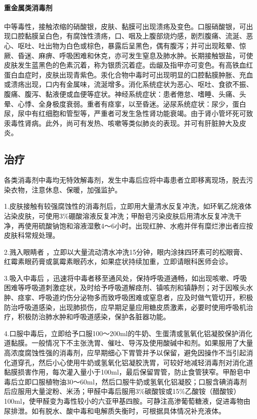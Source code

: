 \paragraph{重金属类消毒剂}

中等毒性，接触浓缩的硝酸银，皮肤、黏膜可出现溃疡及变色。口服硝酸银，可出现口腔黏膜呈白色，有腐蚀性溃疡，口、咽及上腹部烧灼感，剧烈腹痛、流涎、恶心、呕吐、吐出物为白色或棕色，暴露后呈黑色，偶有腹泻；并可出现眩晕、惊厥、昏迷、麻痹、呼吸困难和休克，亦可发生窒息及肺水肿。长期接触银盐，可使皮肤发生蓝黑色的色素沉着，称为银质沉着症。齿龈及指甲亦可变色。有高铁血红蛋白血症时，皮肤出现青紫色。汞化合物中毒时可出现明显的口腔黏膜肿胀、充血或溃疡出现，口内有金属味，流涎增多。消化系统症状为恶心、呕吐、食欲不振、腹痛、腹泻、黏液便或血便等症状。神经系统症状：患者倦怠、嗜睡、头痛、头晕、心悸、全身极度衰弱。重者有痉挛，以至昏迷。泌尿系统症状：尿少，蛋白尿，尿中有红细胞和管型等，严重者可发生急性肾功能衰竭。由于肾小管坏死可致汞毒性肾病。此外，尚可有发热、咳嗽等类似肺炎的表现。并可有肝脏肿大及皮炎。

\subsection{治疗}

各类消毒剂中毒均无特效解毒剂，发生中毒后应将中毒患者立即移离现场，脱去污染衣物，注意休息、保暖，加强监护。

1.皮肤接触有较强腐蚀性的消毒剂后，立即用大量清水反复冲洗，如环氧乙烷液体沾染皮肤，可使用3\%硼酸溶液反复冲洗；甲酚皂污染皮肤后用清水反复冲洗干净，再使用硫酸钠饱和溶液湿敷4～6小时。出现红肿、水疱并伴有糜烂渗出者应按皮肤科常规处理。

2.溅入眼睛者
，立即以大量流动清水冲洗15分钟，眼内涂抹四环素可的松眼膏、红霉素眼药膏或氯霉素眼药水，如果症状持续加重，立即请眼科医师会诊。

3.吸入中毒后
，迅速将中毒者移至通风处，保持呼吸道通畅，如出现咳嗽、呼吸困难等呼吸道刺激症状，及时给予呼吸道解痉剂、镇咳剂和镇静剂；对于因喉头水肿、痉挛、呼吸道灼伤分泌物多而致呼吸困难或窒息者，应及时做气管切开，积极防治呼吸道感染，出现肺损伤，应早期足量应用糖皮质激素，必要时使用呼吸机治疗，积极防治肺水肿和呼吸道感染，保护各脏器功能。

4.口服中毒后，立即给予口服100～200ml的牛奶、生蛋清或氢氧化铝凝胶保护消化道黏膜。一般情况下不主张洗胃、催吐、导泻及使用酸碱中和剂。如果服用了大量高浓度腐蚀性强的消毒剂，应早期细心下胃管并予以保留，避免因操作不当引起消化道穿孔，然后小心使用牛奶或氢氧化铝凝胶洗胃，可较好地减轻消毒剂对消化道黏膜损害作用，每次灌入量小于100ml，最后保留胃管，防止食管狭窄。甲酚皂中毒后立即口服植物油30～60ml，然后口服牛奶或氢氧化铝凝胶；口服含碘消毒剂后应服用大量淀粉、米汤；甲醛中毒后服用3\%碳酸铵或15\%乙酸铵（醋酸铵）100ml，使甲醛变为毒性较小的六亚甲基四胺。可静注高渗葡萄糖液，促进毒物由尿排泄。如有脱水、酸中毒和电解质失衡时，可根据具体情况补充液体。

